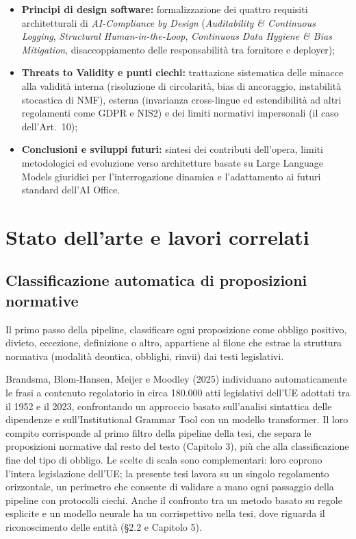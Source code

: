 \documentclass[12pt,a4paper,oneside]{report}
\begin{document}
\begin{itemize}
\begin{itemize}
        \item \textbf{Principi di design software:} formalizzazione dei quattro requisiti architetturali di \textit{AI-Compliance by Design} (\textit{Auditability \& Continuous Logging}, \textit{Structural Human-in-the-Loop}, \textit{Continuous Data Hygiene \& Bias Mitigation}, disaccoppiamento delle responsabilità tra fornitore e deployer);
        \item \textbf{Threats to Validity e punti ciechi:} trattazione sistematica delle minacce alla validità interna (risoluzione di circolarità, bias di ancoraggio, instabilità stocastica di NMF), esterna (invarianza cross-lingue ed estendibilità ad altri regolamenti come GDPR e NIS2) e dei limiti normativi impersonali (il caso dell'Art.~10);
        \item \textbf{Conclusioni e sviluppi futuri:} sintesi dei contributi dell'opera, limiti metodologici ed evoluzione verso architetture basate su Large Language Models giuridici per l'interrogazione dinamica e l'adattamento ai futuri standard dell'AI Office.
    \end{itemize}
\end{itemize}

\chapter{Stato dell'arte e lavori correlati}

\section{Classificazione automatica di proposizioni normative}
Il primo passo della pipeline, classificare ogni proposizione come obbligo positivo, divieto, eccezione, definizione o altro, appartiene al filone che estrae la struttura normativa (modalità deontica, obblighi, rinvii) dai testi legislativi.

Brandsma, Blom-Hansen, Meijer e Moodley (2025) \cite{brandsma2025regulatory} individuano automaticamente le frasi a contenuto regolatorio in circa 180.000 atti legislativi dell'UE adottati tra il 1952 e il 2023, confrontando un approccio basato sull'analisi sintattica delle dipendenze e sull'Institutional Grammar Tool con un modello transformer. Il loro compito corrisponde al primo filtro della pipeline della tesi, che separa le proposizioni normative dal resto del testo (Capitolo 3), più che alla classificazione fine del tipo di obbligo. Le scelte di scala sono complementari: loro coprono l'intera legislazione dell'UE; la presente tesi lavora su un singolo regolamento orizzontale, un perimetro che consente di validare a mano ogni passaggio della pipeline con protocolli ciechi. Anche il confronto tra un metodo basato su regole esplicite e un modello neurale ha un corrispettivo nella tesi, dove riguarda il riconoscimento delle entità (§2.2 e Capitolo 5).
\end{document}
